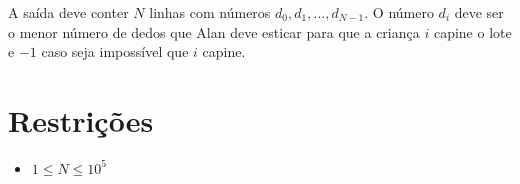 A saída deve conter $N$ linhas com números $d_0, d_1, \ldots, d_{N - 1}$. O número $d_i$ deve ser o menor número de dedos que Alan deve esticar para que a criança $i$ capine o lote e $-1$ caso seja impossível que $i$ capine.

\section*{Restrições}

\begin{itemize}
\item $1 \leq N \leq 10^5$
\end{itemize}

\exemplo
